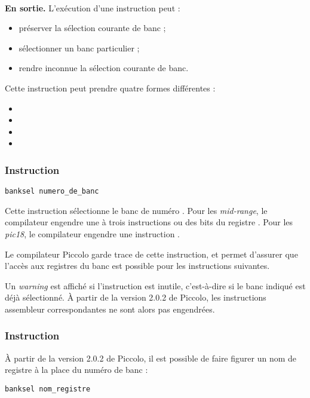 ~\\
\textbf{En sortie.} L'exécution d'une instruction peut :
\begin{itemize}
  \item préserver la sélection courante de banc ;
  \item sélectionner un banc particulier ;
  \item rendre inconnue la sélection courante de banc.
\end{itemize}


Cette instruction peut prendre quatre formes différentes :
\begin{itemize}
  \item {}
  \item {}
  \item {}
  \item {}
\end{itemize}


\subsubsection{Instruction }
\begin{lstlisting}[language=piccolo]
banksel numero_de_banc
\end{lstlisting}

Cette instruction sélectionne le banc de numéro . Pour les \emph{mid-range}, le compilateur engendre une à trois instructions  ou  des bits  du registre . Pour les \emph{pic18}, le compilateur engendre une instruction .

Le compilateur Piccolo garde trace de cette instruction, et permet d'assurer que l'accès aux registres du banc  est possible pour les instructions suivantes.

Un \emph{warning} est affiché si l'instruction est inutile, c'est-à-dire si le banc indiqué est déjà sélectionné. À partir de la version 2.0.2 de Piccolo, les instructions assembleur correspondantes ne sont alors pas engendrées.






\subsubsection{Instruction }
À partir de la version 2.0.2 de Piccolo, il est possible de faire figurer un nom de registre à la place du numéro de banc :
\begin{lstlisting}[language=piccolo]
banksel nom_registre
\end{lstlisting}

